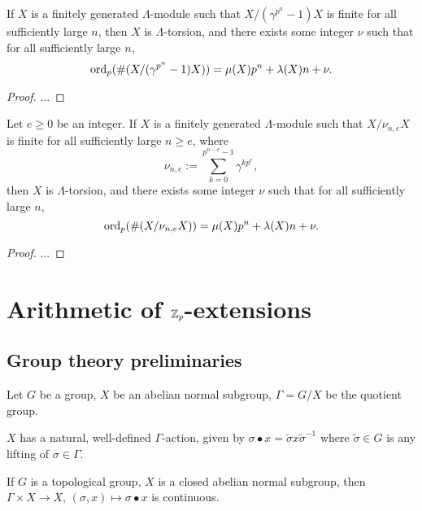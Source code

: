 \begin{prop}
\label{coinvariant-growth}
If $X$ is a finitely generated
$\Lambda$-module such that $X/(\gamma^{p^n}-1)X$ is finite
for all sufficiently large $n$,
then $X$ is $\Lambda$-torsion, and
there exists some integer $\nu$
such that for all sufficiently large $n$,
$$
\operatorname{ord}_p(\#(X/(\gamma^{p^n}-1)X))=\mu(X)p^n
+\lambda(X)n+\nu.
$$
\end{prop}

\begin{proof}
...
\end{proof}

\begin{prop}
\label{coinvariant-growth-2}
Let $e\geq 0$ be an integer.
If $X$ is a finitely generated
$\Lambda$-module such that $X/\nu_{n,e}X$ is finite
for all sufficiently large $n\geq e$, where
$$
\nu_{n,e}:=\sum_{k=0}^{p^{n-e}-1}\gamma^{kp^e},
$$
then $X$ is $\Lambda$-torsion, and
there exists some integer $\nu$
such that for all sufficiently large $n$,
$$
\operatorname{ord}_p(\#(X/\nu_{n,e}X))=\mu(X)p^n
+\lambda(X)n+\nu.
$$
\end{prop}

\begin{proof}
...
\end{proof}

\section{Arithmetic of ${\mathbb {Z}}_p$-extensions}

\subsection{Group theory preliminaries}

Let $G$ be a group, $X$ be an abelian normal subgroup,
$\Gamma=G/X$ be the quotient group.

\begin{definition}
\label{conjugate-action}
$X$ has a natural, well-defined $\Gamma$-action,
given by $\sigma\bullet x
=\widetilde\sigma x\widetilde\sigma^{-1}$
where $\widetilde\sigma\in G$ is any lifting of $\sigma\in\Gamma$.
\end{definition}

\begin{lem}
\label{conjugate-action-cont}
If $G$ is a topological group, $X$ is a closed abelian normal subgroup,
then $\Gamma\times X\to X$, $(\sigma,x)\mapsto\sigma\bullet x$
is continuous.
\end{lem}

